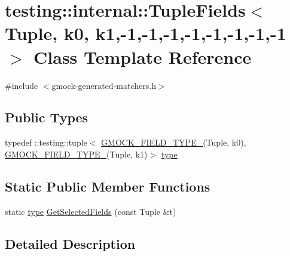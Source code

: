 \hypertarget{classtesting_1_1internal_1_1_tuple_fields_3_01_tuple_00_01k0_00_01k1_00-1_00-1_00-1_00-1_00-1_00-1_00-1_00-1_01_4}{}\section{testing\+:\+:internal\+:\+:Tuple\+Fields$<$ Tuple, k0, k1,-\/1,-\/1,-\/1,-\/1,-\/1,-\/1,-\/1,-\/1 $>$ Class Template Reference}
\label{classtesting_1_1internal_1_1_tuple_fields_3_01_tuple_00_01k0_00_01k1_00-1_00-1_00-1_00-1_00-1_00-1_00-1_00-1_01_4}


{\ttfamily \#include $<$gmock-\/generated-\/matchers.\+h$>$}

\subsection*{Public Types}
\begin{DoxyCompactItemize}
\item 
typedef \+::testing\+::tuple$<$ \hyperlink{gmock-generated-matchers_8h_acf3e27de83a73f0d873da1cd471e505b}{G\+M\+O\+C\+K\+\_\+\+F\+I\+E\+L\+D\+\_\+\+T\+Y\+P\+E\+\_\+}(Tuple, k0), \hyperlink{gmock-generated-matchers_8h_acf3e27de83a73f0d873da1cd471e505b}{G\+M\+O\+C\+K\+\_\+\+F\+I\+E\+L\+D\+\_\+\+T\+Y\+P\+E\+\_\+}(Tuple, k1)$>$ \hyperlink{classtesting_1_1internal_1_1_tuple_fields_3_01_tuple_00_01k0_00_01k1_00-1_00-1_00-1_00-1_00-1_00-1_00-1_00-1_01_4_a3b11f1a0cd0218f2d102b57c19cde352}{type}
\end{DoxyCompactItemize}
\subsection*{Static Public Member Functions}
\begin{DoxyCompactItemize}
\item 
static \hyperlink{classtesting_1_1internal_1_1_tuple_fields_3_01_tuple_00_01k0_00_01k1_00-1_00-1_00-1_00-1_00-1_00-1_00-1_00-1_01_4_a3b11f1a0cd0218f2d102b57c19cde352}{type} \hyperlink{classtesting_1_1internal_1_1_tuple_fields_3_01_tuple_00_01k0_00_01k1_00-1_00-1_00-1_00-1_00-1_00-1_00-1_00-1_01_4_a97c0bf10d84e8773ff13857e287f9913}{Get\+Selected\+Fields} (const Tuple \&t)
\end{DoxyCompactItemize}


\subsection{Detailed Description}
